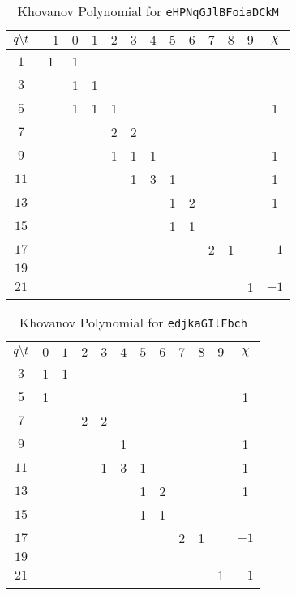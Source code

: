 \documentclass{article}
\theoremstyle{plain}
\begin{document}
        \begin{table}
            \centering
            \begin{tabular}{| c | c | c | c | c | c | c | c | c | c | c | c | c |}
                \hline
                $q\symbol{92}t$&$-1$&$0$&$1$&$2$&$3$&$4$&$5$&$6$&$7$&$8$&$9$&$\chi$\\
                \hline
                $1$&1&1&&&&&&&&&&\\
                \hline
                $3$&&1&1&&&&&&&&&\\
                \hline
                $5$&&1&1&1&&&&&&&&1\\
                \hline
                $7$&&&&2&2&&&&&&&\\
                \hline
                $9$&&&&1&1&1&&&&&&1\\
                \hline
                $11$&&&&&1&3&1&&&&&1\\
                \hline
                $13$&&&&&&&1&2&&&&1\\
                \hline
                $15$&&&&&&&1&1&&&&\\
                \hline
                $17$&&&&&&&&&2&1&&$-1$\\
                \hline
                $19$&&&&&&&&&&&&\\
                \hline
                $21$&&&&&&&&&&&1&$-1$\\
                \hline
            \end{tabular}
            \caption{Khovanov Polynomial for \texttt{eHPNqGJlBFoiaDCkM}}
        \end{table}
        \begin{table}
            \centering
            \begin{tabular}{| c | c | c | c | c | c | c | c | c | c | c | c |}
                \hline
                $q\symbol{92}t$&$0$&$1$&$2$&$3$&$4$&$5$&$6$&$7$&$8$&$9$&$\chi$\\
                \hline
                $3$&1&1&&&&&&&&&\\
                \hline
                $5$&1&&&&&&&&&&1\\
                \hline
                $7$&&&2&2&&&&&&&\\
                \hline
                $9$&&&&&1&&&&&&1\\
                \hline
                $11$&&&&1&3&1&&&&&1\\
                \hline
                $13$&&&&&&1&2&&&&1\\
                \hline
                $15$&&&&&&1&1&&&&\\
                \hline
                $17$&&&&&&&&2&1&&$-1$\\
                \hline
                $19$&&&&&&&&&&&\\
                \hline
                $21$&&&&&&&&&&1&$-1$\\
                \hline
            \end{tabular}
            \caption{Khovanov Polynomial for \texttt{edjkaGIlFbch}}
        \end{table}
\end{document}
